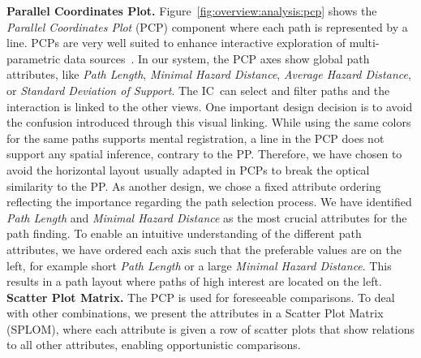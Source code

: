 \documentclass[conference,10pt,letter]{IEEEtran}
\def\IC{IC}
\begin{document}
\noindent \textbf{Parallel Coordinates Plot.} Figure~\ref{fig:overview:analysis:pcp} shows the \emph{Parallel Coordinates Plot} (PCP) component where each path is represented by a line. PCPs are very well suited to enhance interactive exploration of multi-parametric data sources~\cite{Tory05aparallel}. In our system, the PCP axes show global path attributes, like \emph{Path Length}, \emph{Minimal Hazard Distance}, \emph{Average Hazard Distance}, or \emph{Standard Deviation of Support}. The \IC\ can select and filter paths and the interaction is linked to the other views. One important design decision is to avoid the confusion introduced through this visual linking. While using the same colors for the same paths supports mental registration, a line in the PCP does not support any spatial inference, contrary to the PP. Therefore, we have chosen to avoid the horizontal layout usually adapted in PCPs to break the optical similarity to the PP. As another design, we chose a fixed attribute ordering reflecting the importance regarding the path selection process. We have identified \emph{Path Length} and \emph{Minimal Hazard Distance} as the most crucial attributes for the path finding. To enable an intuitive understanding of the different path attributes, we have ordered each axis such that the preferable values are on the left, for example short \emph{Path Length} or a large \emph{Minimal Hazard Distance}. This results in a path layout where paths of high interest are located on the left. \\
%
\noindent \textbf{Scatter Plot Matrix.} The PCP is used for foreseeable comparisons. To deal with other combinations, we present the attributes in a Scatter Plot Matrix (SPLOM), where each attribute is given a row of scatter plots that show relations to all other attributes, enabling opportunistic comparisons.
\end{document}
